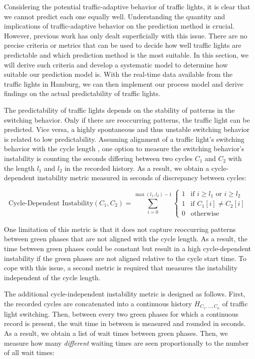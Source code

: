 Considering the potential traffic-adaptive behavior of traffic lights, it is clear that we cannot predict each one equally well. Understanding the quantity and implications of traffic-adaptive behavior on the prediction method is crucial. However, previous work has only dealt superficially with this issue. There are no precise criteria or metrics that can be used to decide how well traffic lights are predictable and which prediction method is the most suitable. In this section, we will derive such criteria and develop a systematic model to determine how suitable our prediction model is. With the real-time data available from the traffic lights in Hamburg, we can then implement our process model and derive findings on the actual predictability of traffic lights.

The predictability of traffic lights depends on the stability of patterns in the switching behavior. Only if there are reoccurring patterns, the traffic light can be predicted. Vice versa, a highly spontaneous and thus unstable switching behavior is related to low predictability. Assuming alignment of a traffic light's switching behavior with the cycle length \cite{protschky_extensive_2014}, one option to measure the switching behavior's instability is counting the seconds differing between two cycles $C_1$ and $C_2$ with the length $l_1$ and $l_2$ in the recorded history. As a result, we obtain a cycle-dependent instability metric measured in seconds of discrepancy between cycles:

\begin{equation} \text{Cycle-Dependent Instability}(C_1, C_2) =  \sum_{i=0}^{\max(l_1, l_2)-1} \left\{
\begin{array}{ll}
1 & \text{if } i \geq l_1 \text{ or } i \geq l_2 \\
1 & \text{if } C_1[i] \neq C_2[i] \\
0 & \text{otherwise}
\end{array} \right.\end{equation}

One limitation of this metric is that it does not capture reoccurring patterns between green phases that are not aligned with the cycle length. As a result, the time between green phases could be constant but result in a high cycle-dependent instability if the green phases are not aligned relative to the cycle start time. To cope with this issue, a second metric is required that measures the instability independent of the cycle length. 

The additional cycle-independent instability metric is designed as follows. First, the recorded cycles are concatenated into a continuous history $H_{C_1, \dots, C_n}$ of traffic light switching. Then, between every two green phases for which a continuous record is present, the wait time in between is measured and rounded in seconds. As a result, we obtain a list of wait times between green phases. Then, we measure how many \textit{different} waiting times are seen proportionally to the number of all wait times:


